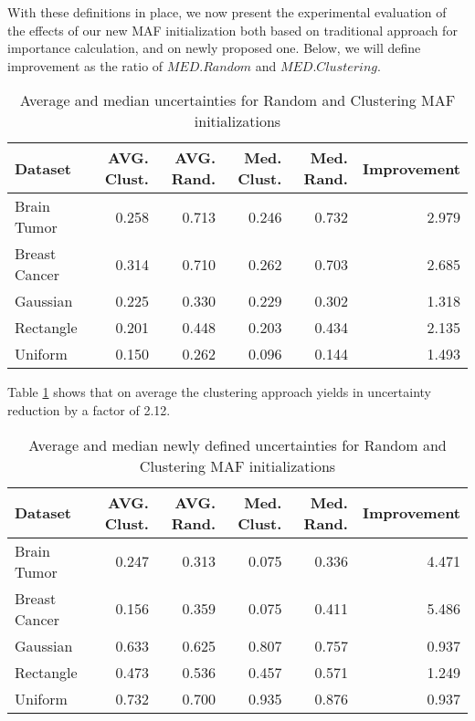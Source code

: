 \documentclass[10pt,a4paper,oneside]{article}
\begin{document}
{\color{black}With these definitions in place, we now present the experimental evaluation of the effects of our new MAF initialization both based on traditional approach for importance calculation, and on newly proposed one.} Below, we will define improvement as the ratio of $MED. Random$ and $MED. Clustering$.

\FloatBarrier

\begin{table}[htbp]
    \caption{Average and median uncertainties for Random and Clustering MAF initializations}
    \centering
    \label{unc-res}
    \begin{tabular}{l|r|r|r|r|r}
    \toprule
    Dataset & AVG. Clust. & AVG. Rand. & Med. Clust. & Med. Rand. & Improvement \\
    \midrule
    Brain Tumor & 0.258 & 0.713 & 0.246 & 0.732 & 2.979 \\
    Breast Cancer & 0.314 & 0.710 & 0.262 & 0.703 & 2.685 \\
    Gaussian & 0.225 & 0.330 & 0.229 & 0.302 & 1.318 \\
    Rectangle & 0.201 & 0.448 & 0.203 & 0.434 & 2.135 \\
    Uniform & 0.150 & 0.262 & 0.096 & 0.144 & 1.493 \\
    \bottomrule
    \end{tabular}
\end{table}
 Table \ref{unc-res} shows that on average the clustering approach yields in uncertainty reduction by a factor of 2.12.

\newpage
\FloatBarrier
\begin{table}[htbp]
    \caption{Average and median newly defined uncertainties for Random and Clustering MAF initializations}
    \centering
    \label{new-unce-res}
    \begin{tabular}{l|r|r|r|r|r}
    \toprule
    Dataset & AVG. Clust. & AVG. Rand. & Med. Clust. & Med. Rand. & Improvement \\
    \midrule
    Brain Tumor & 0.247 & 0.313 & 0.075 & 0.336 & 4.471 \\
    Breast Cancer & 0.156 & 0.359 & 0.075 & 0.411 & 5.486 \\
    Gaussian & 0.633 & 0.625 & 0.807 & 0.757 & 0.937 \\
    Rectangle & 0.473 & 0.536 & 0.457 & 0.571 & 1.249 \\
    Uniform & 0.732 & 0.700 & 0.935 & 0.876 & 0.937 \\
    \bottomrule
    \end{tabular}
    \label{tab:my_label}
\end{table}
\end{document}
